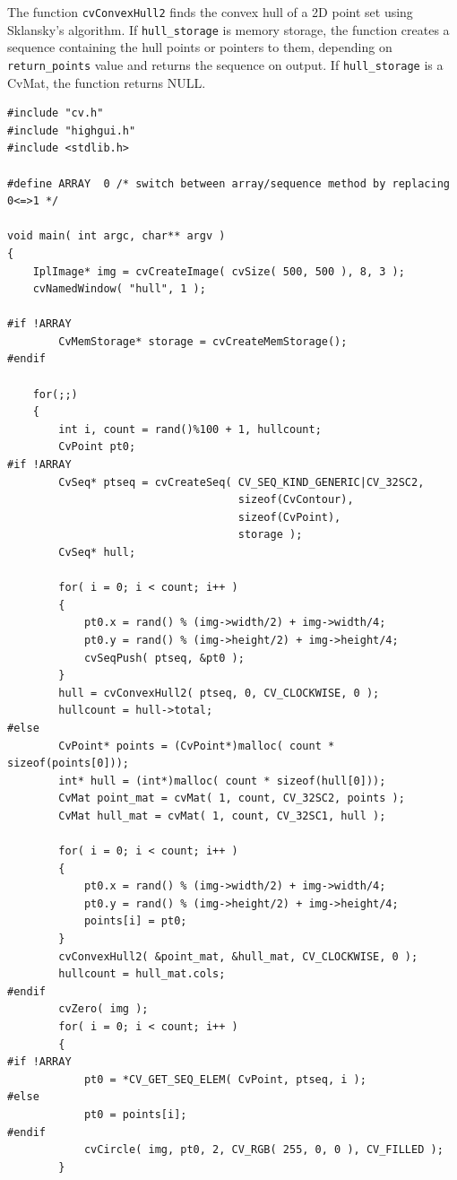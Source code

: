 The function \texttt{cvConvexHull2} finds the convex hull of a 2D point set using Sklansky's algorithm. If \texttt{hull\_storage} is memory storage, the function creates a sequence containing the hull points or pointers to them, depending on \texttt{return\_points} value and returns the sequence on output.  If \texttt{hull\_storage} is a CvMat, the function returns NULL.

\begin{lstlisting}
#include "cv.h"
#include "highgui.h"
#include <stdlib.h>

#define ARRAY  0 /* switch between array/sequence method by replacing 0<=>1 */

void main( int argc, char** argv )
{
    IplImage* img = cvCreateImage( cvSize( 500, 500 ), 8, 3 );
    cvNamedWindow( "hull", 1 );

#if !ARRAY
        CvMemStorage* storage = cvCreateMemStorage();
#endif

    for(;;)
    {
        int i, count = rand()%100 + 1, hullcount;
        CvPoint pt0;
#if !ARRAY
        CvSeq* ptseq = cvCreateSeq( CV_SEQ_KIND_GENERIC|CV_32SC2,
                                    sizeof(CvContour),
                                    sizeof(CvPoint),
                                    storage );
        CvSeq* hull;

        for( i = 0; i < count; i++ )
        {
            pt0.x = rand() % (img->width/2) + img->width/4;
            pt0.y = rand() % (img->height/2) + img->height/4;
            cvSeqPush( ptseq, &pt0 );
        }
        hull = cvConvexHull2( ptseq, 0, CV_CLOCKWISE, 0 );
        hullcount = hull->total;
#else
        CvPoint* points = (CvPoint*)malloc( count * sizeof(points[0]));
        int* hull = (int*)malloc( count * sizeof(hull[0]));
        CvMat point_mat = cvMat( 1, count, CV_32SC2, points );
        CvMat hull_mat = cvMat( 1, count, CV_32SC1, hull );

        for( i = 0; i < count; i++ )
        {
            pt0.x = rand() % (img->width/2) + img->width/4;
            pt0.y = rand() % (img->height/2) + img->height/4;
            points[i] = pt0;
        }
        cvConvexHull2( &point_mat, &hull_mat, CV_CLOCKWISE, 0 );
        hullcount = hull_mat.cols;
#endif
        cvZero( img );
        for( i = 0; i < count; i++ )
        {
#if !ARRAY
            pt0 = *CV_GET_SEQ_ELEM( CvPoint, ptseq, i );
#else
            pt0 = points[i];
#endif
            cvCircle( img, pt0, 2, CV_RGB( 255, 0, 0 ), CV_FILLED );
        }


\end{lstlisting}
